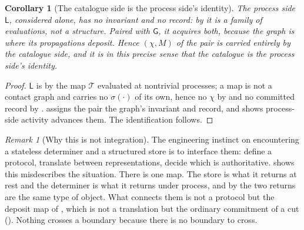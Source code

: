 \documentclass[11pt,twocolumn,a4paper]{article}
\theoremstyle{dirthm}
\newtheorem{corollary}[theorem]{Corollary}
\theoremstyle{definition}
\theoremstyle{remark}
\newtheorem{remark}[theorem]{Remark}
\newcommand{\str}{\sigma}
\newcommand{\rec}{M}
\newcommand{\Char}{\chi}
\newcommand{\Tab}{\mathcal{T}}
\newcommand{\Model}{\mathsf{L}}
\newcommand{\Graph}{\mathsf{G}}
\begin{document}
\begin{corollary}[The catalogue side is the process side's identity]
\label{cor:graph-is-identity}
The process side $\Model$, considered alone, has no invariant and no record:
by  it is a family of evaluations, not a structure. Paired
with $\Graph$, it acquires both, because the graph is where its propagations
deposit. Hence $(\Char,\rec)$ of the pair is carried entirely by the
catalogue side, and it is in this precise sense that the catalogue is the
process side's identity.
\end{corollary}

\begin{proof}
$\Model$ is by  the map $\Tab$ evaluated at nontrivial
processes; a map is not a contact graph and carries no $\str(\cdot)$ of its
own, hence no $\Char$ by  and no committed record by
.  assigns the pair the graph's invariant
and record, and  shows process-side activity advances
them. The identification follows.
\end{proof}

\begin{remark}[Why this is not integration]
\label{rem:not-integration}
The engineering instinct on encountering a stateless determiner and a
structured store is to interface them: define a protocol, translate between
representations, decide which is authoritative.  shows
this misdescribes the situation. There is one map. The store is what it
returns at rest and the determiner is what it returns under process, and by
 the two returns are the same type of object. What
connects them is not a protocol but the deposit map of , which
is not a translation but the ordinary commitment of a cut
(). Nothing crosses a boundary because there is no
boundary to cross.
\end{remark}
\end{document}
